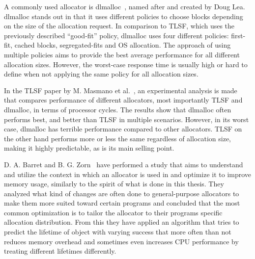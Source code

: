

A commonly used allocator is dlmalloc~\cite{dlmalloc}, named after and created by Doug Lea. dlmalloc stands out in that it uses different policies to choose blocks depending on the size of the allocation request. In comparison to TLSF, which uses the previously described ``good-fit'' policy, dlmalloc uses four different policies: first-fit, cached blocks, segregated-fits and OS allocation. The approach of using multiple policies aims to provide the best average performance for all different allocation sizes. However, the worst-case response time is usually high or hard to define when not applying the same policy for all allocation sizes.

In the TLSF paper by M. Masmano et al.~\cite{TLSF}, an experimental analysis is made that compares performance of different allocators, most importantly TLSF and dlmalloc, in terms of processor cycles. The results show that dlmalloc often performs best, and better than TLSF in multiple scenarios. However, in its worst case, dlmalloc has terrible performance compared to other allocators. TLSF on the other hand performs more or less the same regardless of allocation size, making it highly predictable, as is its main selling point.



\newpage

D. A. Barret and B. G. Zorn~\cite{lifetime_predictors_memalloc} have performed a study that aims to understand and utilize the context in which an allocator is used in and optimize it to improve memory usage, similarly to the spirit of what is done in this thesis. They analyzed what kind of changes are often done to general-purpose allocators to make them more suited toward certain programs and concluded that the most common optimization is to tailor the allocator to their programs specific allocation distribution. From this they have applied an algorithm that tries to predict the lifetime of object with varying success that more often than not reduces memory overhead and sometimes even increases CPU performance by treating different lifetimes differently.


